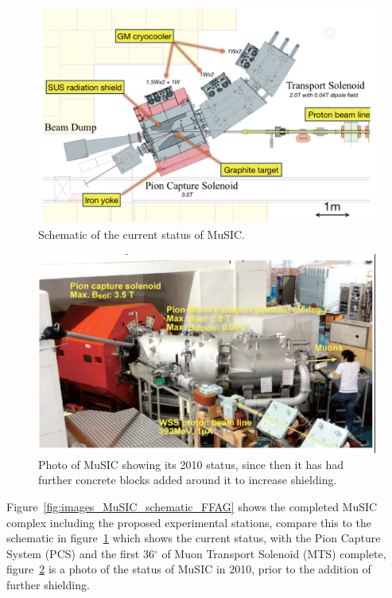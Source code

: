 \begin{figure}[htbp]
  \centering
    \includegraphics[width=.9\textwidth]{images/MuSIC_current_schematic.png}
  \caption{Schematic of the current status of MuSIC.}
  \label{fig:images_MuSIC_current_schematic}
\end{figure}
\begin{figure}[htbp]
  \centering
    \includegraphics[width=.9\textwidth]{images/MuSIC_photo.png}
  \caption{Photo of MuSIC showing its 2010 status, since then it has had further concrete blocks added around it to increase shielding.}
  \label{fig:images_MuSIC_photo}
\end{figure}

Figure~\ref{fig:images_MuSIC_schematic_FFAG} shows the completed MuSIC complex including the proposed experimental stations, compare this to the schematic in  figure~\ref{fig:images_MuSIC_current_schematic} which shows the current status, with the Pion Capture System (PCS) and the first 36\(^{\circ}\) of Muon Transport Solenoid (MTS) complete, figure~\ref{fig:images_MuSIC_photo} is a photo of the status of MuSIC in 2010, prior to the addition of further shielding.

